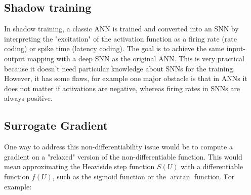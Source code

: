 \documentclass[11pt]{article}
\begin{document}
\subsection{Shadow training}

In shadow training, a classic ANN is trained and converted into an SNN by interpreting the "excitation" of the activation function as a firing rate (rate coding) or spike time (latency coding). The goal is to achieve the same input-output mapping with a deep SNN as the original ANN. This is very practical because it doesn't need particular knowledge about SNNs for the training. However, it has some flaws, for example one major obstacle is that in ANNs it does not matter if activations are negative, whereas firing rates in SNNs are always positive.\cite{pfeiffer2018}

\subsection{Surrogate Gradient}

One way to address this non-differentiability issue would be to compute a gradient on a "relaxed" version of the non-differentiable function. This would mean approximating the Heaviside step function $S(U)$ with a differentiable function $f(U)$, such as the sigmoid function or the $\arctan$ function. For example:
\end{document}
